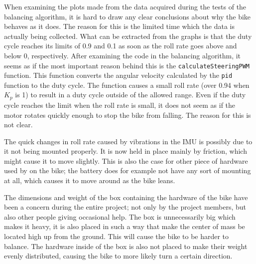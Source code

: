 When examining the plots made from the data acquired during the tests of the balancing algorithm, it is hard to draw any clear conclusions about why the bike behaves as it does. The reason for this is the limited time which the data is actually being collected. What can be extracted from the graphs is that the duty cycle reaches its limits of 0.9 and 0.1 as soon as the roll rate goes above and below 0, respectively. After examining the code in the balancing algorithm, it seems as if the most important reason behind this is the \texttt{calculateSteeringPWM} function. This function converts the angular velocity calculated by the \texttt{pid} function to the duty cycle. The function causes a small roll rate (over 0.94 when $K_p$ is 1) to result in a duty cycle outside of the allowed range. Even if the duty cycle reaches the limit when the roll rate is small, it does not seem as if the motor rotates quickly enough to stop the bike from falling. The reason for this is not clear.

The quick changes in roll rate caused by vibrations in the IMU is possibly due to it not being mounted properly. It is now held in place mainly by friction, which might cause it to move slightly. This is also the case for other piece of hardware used by on the bike; the battery does for example not have any sort of mounting at all, which causes it to move around as the bike leans.

The dimensions and weight of the box containing the hardware of the bike have been a concern during the entire project; not only by the project members, but also other people giving occasional help. The box is unnecessarily big which makes it heavy, it is also placed in such a way that make the center of mass be located high up from the ground. This will cause the bike to be harder to balance. The hardware inside of the box is also not placed to make their weight evenly distributed, causing the bike to more likely turn a certain direction.